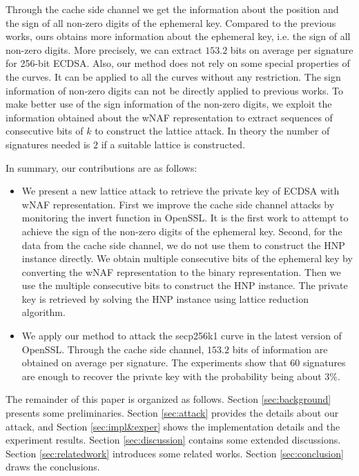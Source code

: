 Through the cache side channel we get the information about the position and the sign of all non-zero digits of the ephemeral key.
Compared to the previous works, ours obtains more information about the ephemeral key, i.e. the sign of all non-zero digits.
 More precisely, we can extract $153.2$ bits on average per signature for 256-bit ECDSA.
Also, our method does not rely on some special properties of the curves.
It  can be applied to all the curves without any restriction.
The sign information of non-zero digits can not be directly applied to previous works.
To make better use of the sign information of the non-zero digits, we exploit the information obtained about the wNAF representation to extract sequences of consecutive bits of $k$ to construct the lattice attack.
In theory the number of signatures needed is $2$ if a suitable lattice is constructed.






In summary, our contributions are as follows:
\begin{itemize}
  \item
  We present a new lattice attack to retrieve the private key of ECDSA with wNAF representation.
  First we
    improve the cache side channel attacks by monitoring
      the invert function in OpenSSL.
      It is the first work to attempt to achieve the sign of the non-zero digits of the ephemeral key.
   Second, for the data from the cache side channel, we do not use them to construct the HNP instance directly.
    We obtain multiple consecutive bits of the ephemeral key by converting the wNAF representation to the binary representation.
    Then we use the multiple consecutive bits to construct the HNP instance.
The private key is retrieved by solving the HNP instance using lattice reduction algorithm.

  \item
    We apply our method to attack the secp256k1 curve in the latest version of OpenSSL.
     Through the cache side channel, $153.2$ bits of information are obtained on average per signature.
    The experiments show that $60$ signatures are enough to recover the private key with the probability being about $3\%$.
\end{itemize}

The remainder of this paper is organized as follows.
Section \ref{sec:background} presents some preliminaries.
Section \ref{sec:attack} provides the details about our attack,
and Section \ref{sec:impl&exper} shows the implementation details and the experiment results.
Section \ref{sec:discussion} contains some extended discussions.
Section \ref{sec:relatedwork} introduces some related works.
Section \ref{sec:conclusion} draws the conclusions.

